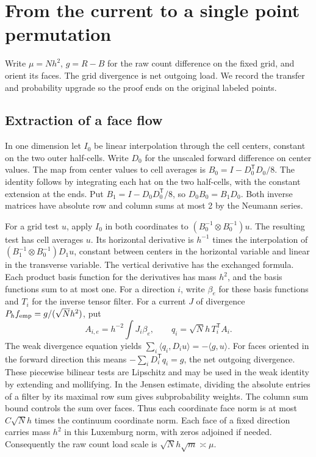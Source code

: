 \documentclass[11pt]{article}
\begin{document}
\section{From the current to a single point permutation}

Write \(\mu=Nh^2\), \(g=R-B\) for the raw count difference
on the fixed grid, and orient its faces. The grid divergence
is net outgoing load. We record the transfer and probability
upgrade so the proof ends on the original labeled points.

\subsection*{Extraction of a face flow}
In one dimension let \(I_0\) be linear interpolation through
the cell centers, constant on the two outer half-cells.
Write \(D_0\) for the unscaled forward difference on center
values. The map from center values to cell averages is
\(B_0=I-D_0^{\mathsf T}D_0/8\). The identity follows by
integrating each hat on the two half-cells, with the
constant extension at the ends. Put
\(B_1=I-D_0D_0^{\mathsf T}/8\), so \(D_0B_0=B_1D_0\).
Both inverse matrices have absolute row and column sums
at most 2 by the Neumann series.

For a grid test \(u\), apply \(I_0\) in both coordinates
to \((B_0^{-1}\otimes B_0^{-1})u\).
The resulting test has cell averages \(u\).
Its horizontal derivative is \(h^{-1}\) times the
interpolation of \((B_1^{-1}\otimes B_0^{-1})D_1u\),
constant between centers in the horizontal variable and
linear in the transverse variable. The vertical derivative
has the exchanged formula. Each product basis function for
the derivatives has mass \(h^2\), and the basis functions
sum to at most one. For a direction \(i\), write \(\beta_e\)
for these basis functions and \(T_i\) for the inverse tensor
filter. For a current \(J\) of divergence
\(P_h f_{\rm emp}=g/(\sqrt N h^2)\), put
\[
 A_{i,e}=h^{-2}\int J_i\beta_e,\qquad
 q_i=\sqrt N h\,T_i^{\mathsf T} A_i.
\]
The weak divergence equation yields
\(\sum_i\langle q_i,D_i u\rangle=-\langle g,u\rangle\).
For faces oriented in the forward direction this means
\(-\sum_i D_i^{\mathsf T}q_i=g\), the net outgoing divergence.
These piecewise bilinear tests are Lipschitz and may be used
in the weak identity by extending and mollifying. In the
Jensen estimate, dividing the absolute entries of a filter
by its maximal row sum gives subprobability weights.
The column sum bound controls the sum over faces.
Thus each coordinate face norm is at most
\(C\sqrt N h\) times the continuum coordinate norm.
Each face of a fixed direction carries mass \(h^2\) in this
Luxemburg norm, with zeros adjoined if needed.
Consequently the raw count load scale is
\(\sqrt N h\sqrt m\asymp\mu\).
\end{document}

